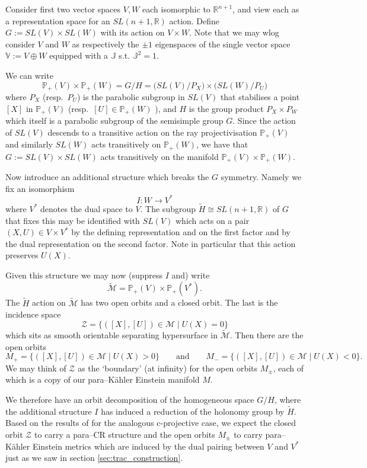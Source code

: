 Consider first two vector spaces $V,W$ each isomorphic to $\mathbb{R}^{n+1}$, and view each as a representation space for an $SL(n+1,\mathbb{R})$ action. Define $G:= SL(V)\times SL(W)$ with its action on $V\times W$. Note that we may
wlog consider $V$ and $W$ as respectively the $\pm 1$ eigenspaces of the single vector space $\mathbb{V}:=V\oplus W$ equipped with a
$\mathbb{J}$ s.t. $\mathbb{J}^2=1$.

We can write 
\[
\mathbb{P}_+(V) \times \mathbb{P}_+(W)=G/H=\big( SL(V)/P_X \big)\times \big( SL(W)/P_U \big)
\]
where $P_X$ (resp.\ $P_U$) is the parabolic subgroup in $SL(V)$
that stabilises a point $[X]$ in $\mathbb{P}_+(V)$ (resp.\ $[U] \in \mathbb{P}_+(W)$
), and $H$ is the group product $P_X\times P_W$ which itself is a
parabolic subgroup of the semisimple group $G$.
Since the action of $SL(V)$ descends to a transitive action on the ray projectivisation $\mathbb{P}_+(V)$ and similarly $SL(W)$ acts
transitively on $\mathbb{P}_+(W)$, we have that $G:= SL(V)\times SL(W)$ acts transitively on the manifold $\mathbb{P}_+(V) \times \mathbb{P}_+(W)$.


Now introduce an additional structure which breaks the $G$
symmetry. 
Namely we fix an isomorphism
$$
I:W\to V^*
$$
where $V^*$ denotes the dual space to $V$. The subgroup $\tilde{H}\cong SL(n+1,\mathbb{R})$ of $G$
that fixes this may be identified with $SL(V)$ which acts on a pair
$(X,U)\in V\times V^*$ by the defining representation and on the first
factor and by the dual representation on the second factor. Note in particular that this action preserves $U(X)$.

Given this structure we may now (suppress $I$ and) write
$$
\widetilde{\mathcal{M}}= \mathbb{P}_+(V) \times \mathbb{P}_+(V^*).
$$
The $\tilde{H}$ action on $\widetilde{\mathcal{M}}$ has two open orbits and a closed orbit. The last
is the incidence space 
$$
\mathcal{Z}=\{ ([X],[U])\in \mathcal{M} \mid U(X)=0 \} 
$$
which sits as smooth orientable separating hypersurface in $\widetilde{\mathcal{M}}$. Then there are the open orbits
$$
M_+=\{ ([X],[U])\in \mathcal{M} \mid U(X)>0 \} \qquad \mbox{and} \qquad
M_-=\{ ([X],[U])\in \mathcal{M} \mid U(X)<0 \}.
$$
We may think of $\mathcal{Z}$ as the `boundary' (at infinity) for the open orbits $M_\pm$, each of which is a copy of our para--K\"ahler Einstein manifold $M$.

We therefore have an orbit decomposition of the homogeneous space $G/H$, where the additional structure $I$ has induced a reduction of the holonomy group by $\tilde{H}$. Based on the results of \cite{CGH-duke} for the analogous c-projective case, we expect the closed orbit $\mathcal{Z}$ to carry a para--CR structure and the open orbits $M_\pm$ to carry para--K\"ahler Einstein metrics which are induced by the dual pairing between $V$ and $V^*$ just as we saw in section \ref{sec:trac_construction}.

